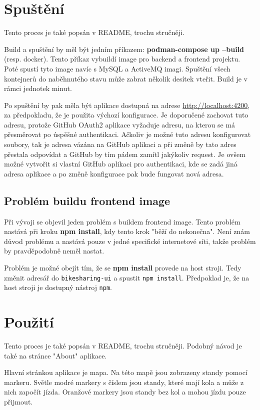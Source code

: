 \documentclass[12pt, letterpaper]{article}
\begin{document}
\section{Spuštění}
Tento proces je také popsán v README, trochu stručněji.

Build a spuštění by měl být jedním příkazem: \textbf{podman-compose up --build} (resp. docker). Tento příkaz vybuildí
image pro backend a frontend projektu. Poté spustí tyto image navíc s MySQL a ActiveMQ imagi. Spuštění všech kontejnerů
do naběhnutého stavu může zabrat několik desítek vteřit. Build je v rámci jednotek minut.

Po spuštění by pak měla být aplikace dostupná na adrese \url{http://localhost:4200}, za předpokladu, že je použita
výchozí konfigurace. Je doporučené zachovat tuto adresu, protože GitHub OAuth2 aplikace vyžaduje adresu, na kterou se
má přesměrovat po úspěšné authentikaci. Ačkoliv je možné tuto adresu konfigurovat soubory, tak je adresa vázána na 
GitHub aplikaci a při změně by tato adres přestala odpovídat a GitHub by tím pádem zamítl jakýkoliv request. Je ovšem
možné vytvořit si vlastní GitHub aplikaci pro authentikaci, kde se zadá jiná adresa aplikace a po změně konfigurace 
pak bude fungovat nová adresa.
%
\subsection{Problém buildu frontend image}
Při vývoji se objevil jeden problém s buildem frontend image. Tento problém nastává při kroku \textbf{npm install},
kdy tento krok "běží do nekonečna". Není znám důvod problému a nastává pouze v jedné specifické internetové
síti, takže problém by pravděpodobně neměl nastat. 

Problém je možné obejít tím, že se \textbf{npm install} provede na host stroji. Tedy změnit adresář do 
\texttt{bikesharing-ui} a spustit \texttt{npm install}. Předpoklad je, že na host stroji je dostupný nástroj 
\texttt{npm}.
\section{Použití}
Tento proces je také popsán v README, trochu stručněji. Podobný návod je také na stránce "About" aplikace.

Hlavní stránkou aplikace je mapa. Na této mapě jsou zobrazeny standy pomocí markeru. Světle modré markery s číslem
jsou standy, které mají kola a může z nich započít jízda. Oranžové markery jsou standy bez kol a mohou jízdu pouze
přijmout.
\end{document}
